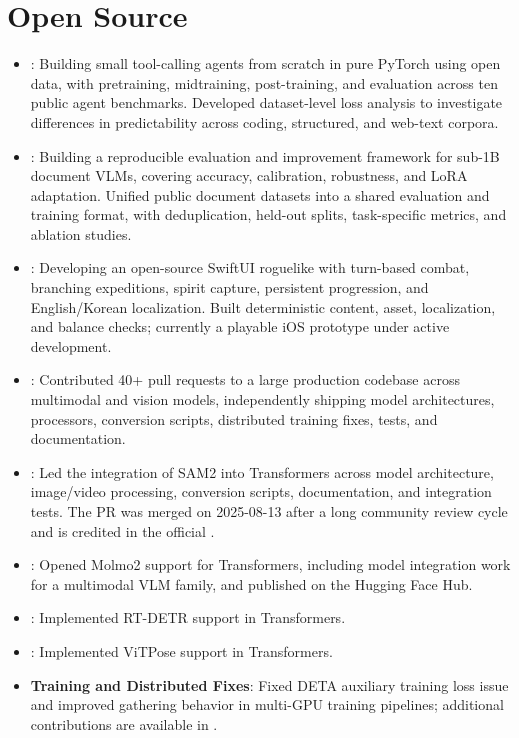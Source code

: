 \documentclass[letterpaper,11pt]{article}
\newcommand{\MYhref}[3][blue]{\href{#2}{\color{#1}{#3}}}
\newcommand{\resumeItem}[2]{
  \item\small{
    \textbf{#1}{: #2 \vspace{-2pt}}
  }
}
\newcommand{\resumeSubItem}[2]{\resumeItem{#1}{#2}\vspace{-4pt}}
\newcommand{\resumeSubHeadingListStart}{\begin{itemize}[leftmargin=*]}
\newcommand{\resumeSubHeadingListEnd}{\end{itemize}}
\begin{document}
\section{Open Source}
  \resumeSubHeadingListStart
    \resumeSubItem{\MYhref{https://github.com/SangbumChoi/OpenLocalAgent}{OpenLocalAgent}}
      {Building small tool-calling agents from scratch in pure PyTorch using open data, with pretraining, midtraining, post-training, and evaluation across ten public agent benchmarks. Developed dataset-level loss analysis to investigate differences in predictability across coding, structured, and web-text corpora.}
    \resumeSubItem{\MYhref{https://github.com/SangbumChoi/OCR}{OCR}}
      {Building a reproducible evaluation and improvement framework for sub-1B document VLMs, covering accuracy, calibration, robustness, and LoRA adaptation. Unified public document datasets into a shared evaluation and training format, with deduplication, held-out splits, task-specific metrics, and ablation studies.}
    \resumeSubItem{\MYhref{https://github.com/SangbumChoi/Absorbed}{Absorbed}}
      {Developing an open-source SwiftUI roguelike with turn-based combat, branching expeditions, spirit capture, persistent progression, and English/Korean localization. Built deterministic content, asset, localization, and balance checks; currently a playable iOS prototype under active development.}
    \resumeSubItem{\MYhref{https://github.com/huggingface/transformers/pulls?q=is\%3Apr+SangbumChoi}{Hugging Face Transformers}}
      {Contributed 40+ pull requests to a large production codebase across multimodal and vision models, independently shipping model architectures, processors, conversion scripts, distributed training fixes, tests, and documentation.}
    \resumeSubItem{\MYhref{https://github.com/huggingface/transformers/pull/32317}{Hugging Face Transformers - Segment Anything 2}}
      {Led the integration of SAM2 into Transformers across model architecture, image/video processing, conversion scripts, documentation, and integration tests. The PR was merged on 2025-08-13 after a long community review cycle and is credited in the official \MYhref{https://huggingface.co/docs/transformers/model_doc/sam2}{SAM2 documentation}.}
    \resumeSubItem{\MYhref{https://github.com/huggingface/transformers/pull/43451}{Hugging Face Transformers - Molmo2}}
      {Opened Molmo2 support for Transformers, including model integration work for a multimodal VLM family, and published \MYhref{https://huggingface.co/danelcsb/Molmo2-4B}{danelcsb/Molmo2-4B} on the Hugging Face Hub.}
    \resumeSubItem{\MYhref{https://github.com/huggingface/transformers/pull/29077}{RT-DETR}}
      {Implemented RT-DETR support in Transformers.}
    \resumeSubItem{\MYhref{https://github.com/huggingface/transformers/pull/30530}{ViTPose}}
      {Implemented ViTPose support in Transformers.}
    \resumeSubItem{Training and Distributed Fixes}
      {Fixed DETA auxiliary training loss issue and improved gathering behavior in multi-GPU training pipelines; additional contributions are available in \MYhref{https://github.com/huggingface/transformers/pulls?q=sangbumchoi}{Transformers pull requests}.}
  \resumeSubHeadingListEnd
\end{document}
